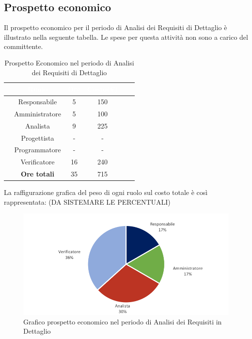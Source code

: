 \subsection{Prospetto economico}
Il prospetto economico per il periodo di Analisi dei Requisiti di Dettaglio è illustrato nella seguente tabella.
Le spese per questa attività non sono a carico del committente.
\begin{table}[ht]
	\begin{center}
		\begin{tabular}{cccccc}
			\rowcolor{coolblack}
			\hline
			&\textcolor{white}{Ruolo}&	\textcolor{white}{Ore} &\textcolor{white}{Costo(\euro)} \\
			\hline
			&Responsabile           &5&150  \\
			&Amministratore        & 5& 100 \\
			&Analista                   & 9& 225 \\
			&Progettista              &  -& - \\
			&Programmatore       & - & -  \\
			&Verificatore             & 16 & 240 \\
			\hline
			&\textbf{Ore totali}    &35& 715\\
		\end{tabular}
		\caption{Prospetto Economico nel periodo di Analisi dei Requisiti di Dettaglio}
	\end{center}
\end{table}

La raffigurazione grafica del peso di ogni ruolo sul costo totale è così rappresentata: (DA SISTEMARE LE PERCENTUALI)
\begin{figure}[!ht]
	\begin{center}
		\includegraphics{images/grafoProspettoEconomicoDett.png}
		\caption{Grafico prospetto economico nel periodo di Analisi dei Requisiti in Dettaglio }
	\end{center}
\end{figure}

